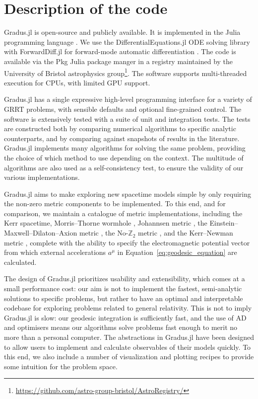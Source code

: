 \documentclass[fleqn,usenatbib]{mnras}
\newcommand{\software}[1]{{\sc #1}}
\newcommand{\Gradus}{\software{Gradus.jl}\xspace}
\begin{document}
\section{Description of the code}
\label{sec:description-of-code}

\Gradus is open-source and publicly available. It is implemented in the Julia
programming language \citep{Bezanson_Julia_A_fresh_2017}. We use the
DifferentialEquations.jl ODE solving library with ForwardDiff.jl for
forward-mode automatic differentiation
\citep{rackauckas_differential_2017,RevelsLubinPapamarkou2016}. The code is
available via the \software{Pkg} Julia package manger in a registry maintained
by the University of Bristol astrophysics
group\footnote{\url{https://github.com/astro-group-bristol/AstroRegistry/}}. The
software supports multi-threaded execution for CPUs, with limited GPU support.

\Gradus has a single expressive high-level programming interface for a variety
of GRRT problems, with sensible defaults and optional fine-grained control. The
software is extensively tested with a suite of unit and integration tests. The
tests are constructed both by comparing numerical algorithms to specific
analytic counterparts, and by comparing against snapshots of results in the
literature. \Gradus implements many algorithms for solving the same problem,
providing the choice of which method to use depending on the context. The
multitude of algorithms are also used as a self-consistency test, to ensure the
validity of our various implementations.

\Gradus aims to make exploring new spacetime models simple by only requiring the
non-zero metric components to be implemented. To this end, and for comparison, we
maintain a catalogue of metric implementations, including the Kerr spacetime,
Morris--Thorne wormhole \citep{morris_wormholes_1988}, Johannsen metric
\citep{johannsen_regular_2013}, the Einstein--Maxwell--Dilaton--Axion metric
\citep{garcia_class_1995}, the No-$\mathbb{Z}_2$ metric
\citep{chen_observational_2024}, and the Kerr--Newman
metric \citep[e.g.][]{hackmann_charged_2013}, complete with the ability to
specify the electromagnetic potential vector from which external accelerations
$a^\mu$ in Equation~\eqref{eq:geodesic_equation} are calculated.

The design of \Gradus prioritizes usability and extensibility, which comes at a
small performance cost: our aim is not to implement the fastest, semi-analytic
solutions to specific problems, but rather to have an optimal and interpretable
codebase for exploring problems related to general relativity.  This is not to
imply \Gradus is slow: our geodesic integration is sufficiently fast, and the
use of AD and optimisers means our algorithms solve problems fast enough to
merit no more than a personal computer. The abstractions in \Gradus have been
designed to allow users to implement and calculate observables of their models
quickly. To this end, we also include a number of visualization and plotting
recipes to provide some intuition for the problem space.
\end{document}

